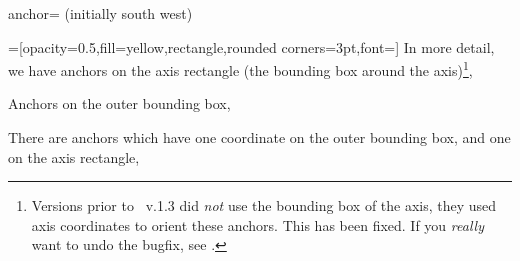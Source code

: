 \begin{pgfplotskey}{anchor= (initially south west)}
{%
\plottable
\def\plot{%
	\begin{axis}[
		width=5cm,
		name=test plot,
		xlabel=$x$,
		ylabel={$y$},%
		legend style={at={(1.03,1)},anchor=north west},
		title=A test plot.
	]
		\addplot table from{\plottable};
		\addlegendentry{$f(x)$}
		\addplot[red] plot[id=gnuplot_ppp,domain=-40:40,samples=120] gnuplot{10000*sin(x/3)};
		\addlegendentry{$g(x)$}
	\end{axis}
}%
\def\showit#1#2{%
	\node[pin=#2:(s.#1),fill=black,circle,scale=0.3] at (test plot.#1) {};
}%
=[opacity=0.5,fill=yellow,rectangle,rounded corners=3pt,font=\tiny]%
In more detail, we have anchors on the axis rectangle (the bounding box around the axis)\footnote{Versions prior to \PGFPlots\ v.1.3 did \emph{not} use the bounding box of the axis, they used axis coordinates to orient these anchors. This has been fixed. If you \emph{really} want to undo the bugfix, see \texttt{\protect{}}.},
		\begin{center}
		\end{center}
Anchors on the outer bounding box,
		\begin{center}
		\end{center}
There are anchors which have one coordinate on the outer bounding box, and one on the axis rectangle,
		\begin{center}
\end{center}}
\end{pgfplotskey}
